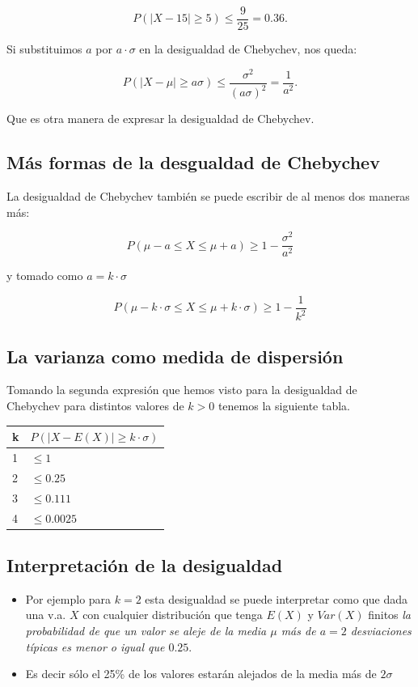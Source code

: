 \documentclass[]{book}
\begin{document}
\[
P(|X-15|\geq 5)\leq \frac9{25}=0.36.
\]

Si substituimos \(a\) por \(a\cdot \sigma\) en la
desigualdad de Chebychev, nos queda:

\[
P(|X-\mu|\geq a \sigma)\leq
\frac{\sigma^2}{(a\sigma)^2}=\frac1{a^2}.
\]

Que es otra manera de expresar la desigualdad de Chebychev.

\hypertarget{muxe1s-formas-de-la-desgualdad-de-chebychev}{%
\subsection{Más formas de la desgualdad de Chebychev}\label{muxe1s-formas-de-la-desgualdad-de-chebychev}}

La desigualdad de Chebychev también se puede escribir de al menos dos maneras más:

\[
P(\mu-a\leq X\leq \mu+a)\geq 1-\frac{\sigma^2}{a^2}
\]

y tomado como \(a=k\cdot \sigma\)

\[
P(\mu-k\cdot \sigma\leq X\leq \mu+ k \cdot \sigma)\geq 1-\frac1{k^2}
\]

\hypertarget{la-varianza-como-medida-de-dispersiuxf3n}{%
\subsection{La varianza como medida de dispersión}\label{la-varianza-como-medida-de-dispersiuxf3n}}

Tomando la segunda expresión que hemos visto para la desigualdad de
Chebychev para distintos valores de \(k>0\) tenemos la siguiente tabla.

\begin{longtable}[]{@{}ll@{}}
\toprule
k & \(P(|X-E(X)|\geq k \cdot \sigma)\)\tabularnewline
\midrule
\endhead
1 & \(\leq 1\)\tabularnewline
2 & \(\leq 0.25\)\tabularnewline
3 & \(\leq 0.111\)\tabularnewline
4 & \(\leq 0.0025\)\tabularnewline
\bottomrule
\end{longtable}

\hypertarget{interpretaciuxf3n-de-la-desigualdad}{%
\subsection{Interpretación de la desigualdad}\label{interpretaciuxf3n-de-la-desigualdad}}

\begin{itemize}
\item
  Por ejemplo para \(k=2\) esta desigualdad se puede interpretar como que dada una v.a. \(X\) con cualquier distribución que tenga \(E(X)\) y \(Var(X)\) finitos \emph{la probabilidad de que un valor se aleje de la media \(\mu\) más de \(a=2\) desviaciones típicas es menor o igual que \(0.25\)}.
\item
  Es decir sólo el 25\% de los valores estarán alejados de la media
  más de \(2\sigma\)
\end{itemize}
\end{document}
